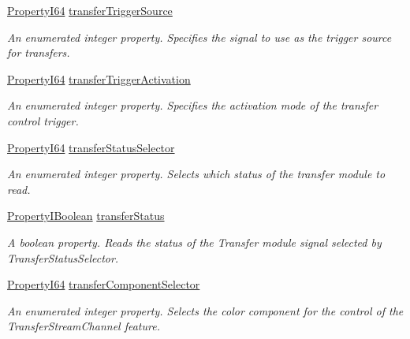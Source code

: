 \begin{DoxyCompactItemize}
\hyperlink{group___common_interface_ga81749b2696755513663492664a18a893}{Property\+I64} \hyperlink{classmv_i_m_p_a_c_t_1_1acquire_1_1_gen_i_cam_1_1_transfer_control_a9317af45736dd72396ed0ac87129201d}{transfer\+Trigger\+Source}
\begin{DoxyCompactList}\small\item\em An enumerated integer property. Specifies the signal to use as the trigger source for transfers. \end{DoxyCompactList}\item 
\hyperlink{group___common_interface_ga81749b2696755513663492664a18a893}{Property\+I64} \hyperlink{classmv_i_m_p_a_c_t_1_1acquire_1_1_gen_i_cam_1_1_transfer_control_a3ec905c1aff4292f8f973bcb77cf2f42}{transfer\+Trigger\+Activation}
\begin{DoxyCompactList}\small\item\em An enumerated integer property. Specifies the activation mode of the transfer control trigger. \end{DoxyCompactList}\item 
\hyperlink{group___common_interface_ga81749b2696755513663492664a18a893}{Property\+I64} \hyperlink{classmv_i_m_p_a_c_t_1_1acquire_1_1_gen_i_cam_1_1_transfer_control_ad0b5402cce56916cd955b9f441da2846}{transfer\+Status\+Selector}
\begin{DoxyCompactList}\small\item\em An enumerated integer property. Selects which status of the transfer module to read. \end{DoxyCompactList}\item 
\hyperlink{group___common_interface_ga44f9437e24b21b6c93da9039ec6786aa}{Property\+I\+Boolean} \hyperlink{classmv_i_m_p_a_c_t_1_1acquire_1_1_gen_i_cam_1_1_transfer_control_af49f438e572556b1b4cedd02ffa97a82}{transfer\+Status}
\begin{DoxyCompactList}\small\item\em A boolean property. Reads the status of the Transfer module signal selected by Transfer\+Status\+Selector. \end{DoxyCompactList}\item 
\hyperlink{group___common_interface_ga81749b2696755513663492664a18a893}{Property\+I64} \hyperlink{classmv_i_m_p_a_c_t_1_1acquire_1_1_gen_i_cam_1_1_transfer_control_a4162691dbc0ef1d245d9af1943e3f8bf}{transfer\+Component\+Selector}
\begin{DoxyCompactList}\small\item\em An enumerated integer property. Selects the color component for the control of the Transfer\+Stream\+Channel feature. \end{DoxyCompactList}\item 

\end{DoxyCompactItemize}
